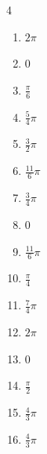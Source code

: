 \begin{multicols}{4}
\begin{enumerate}
  \item $\displaystyle 2\pi$

  \item $\displaystyle 0$

  \item $\displaystyle \frac{\pi}{6}$

  \item $\displaystyle \frac{5}{4}\pi$

  \item $\displaystyle \frac{3}{2}\pi$

  \item $\displaystyle \frac{11}{6}\pi$

\columnbreak %

  \item $\displaystyle \frac{3}{4}\pi$

  \item $\displaystyle 0$

  \item $\displaystyle \frac{11}{6}\pi$

  \item $\displaystyle \frac{\pi}{4}$

  \item $\displaystyle \frac{7}{4}\pi$

  \item $\displaystyle 2\pi$

  \item $\displaystyle 0$

  \item $\displaystyle \frac{\pi}{2}$

  \item $\displaystyle \frac{4}{3}\pi$

  \item $\displaystyle \frac{4}{3}\pi$


\end{enumerate}
\end{multicols}
